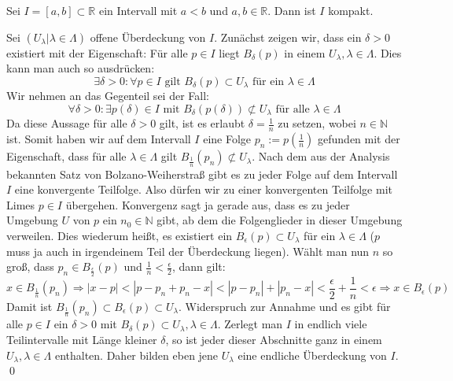 \begin{Satz}\label{satz:intervall}
	Sei \(I = [ a , b ] \subset \mathbb{R}\) ein Intervall mit \(a<b\) und \(a,b \in \mathbb{R}\). Dann 
	ist \(I\) kompakt.
\end{Satz}
	Sei \( (U_{\lambda} | \lambda \in \Lambda) \) offene Überdeckung von \(I\). Zunächst zeigen wir,
	dass ein \(\delta > 0\) existiert mit der Eigenschaft: Für alle \(p \in I\) liegt \(B_{\delta}(p)\)
	in einem \(U_{\lambda}, \lambda \in \Lambda\). Dies kann man auch so ausdrücken: 
	\[ \exists \delta > 0 : \forall p \in I \mbox{ gilt } B_{\delta}(p) \subset U_{\lambda} \mbox { für ein } \lambda \in \Lambda \]
	Wir nehmen an das Gegenteil sei der Fall:
	\[ \forall \delta > 0 : \exists p(\delta) \in I \mbox{ mit } B_{\delta}(p(\delta)) \not\subset U_{\lambda} \mbox { für alle } \lambda \in \Lambda \]
	Da diese Aussage für alle \(\delta > 0\) gilt, ist es erlaubt \(\delta = \frac{1}{n}\) zu setzen, wobei \(n \in \mathbb{N}\) ist.
	Somit haben wir auf dem Intervall \(I\) eine Folge \(p_{n} := p(\frac{1}{n})\) gefunden mit der Eigenschaft, dass für alle \(\lambda \in \Lambda\)
	gilt \(B_{\frac{1}{n}}(p_{n}) \not\subset U_{\lambda}\). Nach dem aus der Analysis bekannten Satz von Bolzano-Weiherstraß gibt
	es zu jeder Folge auf dem Intervall \(I\) eine konvergente Teilfolge. Also dürfen wir zu einer konvergenten Teilfolge mit Limes \(p \in I\) übergehen.
  Konvergenz sagt ja gerade aus, dass es zu jeder Umgebung \(U\) von \(p\) ein \(n_0 \in \mathbb{N}\) gibt, 
	ab dem die Folgenglieder in dieser Umgebung verweilen. Dies wiederum heißt, es existiert ein \(B_{\epsilon}(p) \subset U_{\lambda}\) für ein \(\lambda \in \Lambda\)
	(\(p\) muss ja auch in irgendeinem Teil der Überdeckung liegen). Wählt man nun \(n\) so groß, dass \(p_n \in B_{\frac{\epsilon}{2}}(p)\) und \(\frac{1}{n} < \frac{\epsilon}{2}\),
	dann gilt:
	\[ x \in B_{\frac{1}{n}}(p_n) \Rightarrow |x-p| < |p-p_n+p_n-x| < |p-p_n| + |p_n-x| < \frac{\epsilon}{2} + \frac{1}{n} < \epsilon \Rightarrow x \in B_{\epsilon}(p) \]
	Damit ist \(B_{\frac{1}{n}}(p_n) \subset B_{\epsilon}(p) \subset U_{\lambda}\).
	Widerspruch zur Annahme und es gibt für alle \(p \in I\) ein \(\delta > 0\) mit \(B_{\delta}(p) \subset U_{\lambda}, \lambda \in \Lambda\).
	Zerlegt man \(I\) in endlich viele Teilintervalle mit Länge kleiner \(\delta\), so ist jeder dieser Abschnitte ganz in einem \(U_{\lambda}, \lambda \in \Lambda\)
	enthalten. Daher bilden eben jene \(U_{\lambda}\) eine endliche Überdeckung von \(I\).
\qed

